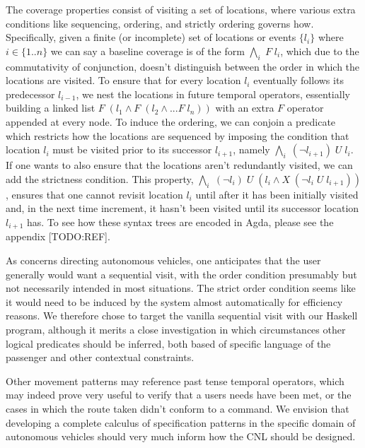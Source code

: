 \documentclass{article}
\begin{document}
The coverage properties consist of visiting a set of locations, where various
extra conditions like sequencing, ordering, and strictly ordering governs how.
Specifically, given a finite (or incomplete) set of locations or events
$\{l_i\}$ where $i \in \{1..n\}$ we can say a baseline coverage is of the form
$\underset{i}{\bigwedge}\; F\; l_i$, which due to the commutativity of
conjunction, doesn't distinguish between the order in which the locations are
visited. To ensure that for every location $l_i$ eventually follows its
predecessor $l_{i-1}$, we nest the locations in future temporal operators,
essentially building a linked list $F\; (l_1 \wedge F\; (l_{2} \wedge ... F\;
l_{n}))$ with an extra $F$ operator appended at every node. To induce the
ordering, we can conjoin a predicate which restricts how the locations are
sequenced by imposing the condition that location $l_{i}$ must be visited prior
to its successor $l_{i+1}$, namely $\underset{i}{\bigwedge}\; (\neg l_{i+1})\;
U\; l_i$. If one wants to also ensure that the locations aren't redundantly
visited, we can add the strictness condition. This property,
$\underset{i}{\bigwedge}\; (\neg l_{i})\; U\; (l_i \wedge X\; (\neg l_i\; U\;
l_{i+1}))$, ensures that one cannot revisit location $l_i$ until after it has
been initially visited and, in the next time increment, it hasn't been visited
until its successor location $l_{i+1}$ has. To see how these syntax trees are
encoded in Agda, please see the appendix [TODO:REF].

As concerns directing autonomous vehicles, one anticipates that the user
generally would want a sequential visit, with the order condition presumably but
not necessarily intended in most situations. The strict order condition seems
like it would need to be induced by the system almost automatically for
efficiency reasons. We therefore chose to target the vanilla sequential visit
with our Haskell program, although it merits a close investigation in which
circumstances other logical predicates should be inferred, both based of
specific language of the passenger and other contextual constraints.

Other movement patterns may reference past tense temporal operators, which may
indeed prove very useful to verify that a users needs have been met, or the
cases in which the route taken didn't conform to a command. We envision that
developing a complete calculus of specification patterns in the specific domain
of autonomous vehicles should very much inform how the CNL should be designed.
\end{document}
